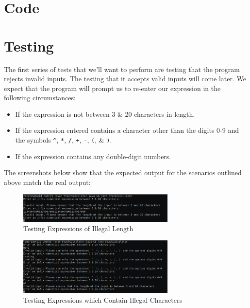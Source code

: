 \documentclass[a4paper]{article}
\begin{document}
\section{Code}


\section{Testing}
The first series of tests that we'll want to perform are testing that the program rejects invalid inputs. 
The testing that it accepts valid inputs will come later. 
We expect that the program will prompt us to re-enter our expression in the following circumstances:
\begin{itemize}
    \item   If the expression is not between 3 \& 20 characters in length.
    \item   If the expression entered contains a character other than the digits 0-9 and the symbols \verb|^|, \verb|*|,
            \verb|/|, \verb|+|, \verb|-|, \verb|(|, \& \verb|)|.
    \item   If the expression contains any double-digit numbers.
\end{itemize}

The screenshots below show that the expected output for the scenarios outlined above match the real output:

\begin{figure}[h]
    \centering
    \includegraphics[width=0.7\textwidth]{images/illegallength.png}
    \caption{Testing Expressions of Illegal Length}
\end{figure}

\begin{figure}[h]
    \centering
    \includegraphics[width=0.7\textwidth]{images/illegalcharacters.png}
    \caption{Testing Expressions which Contain Illegal Characters}
\end{figure}
\end{document}
